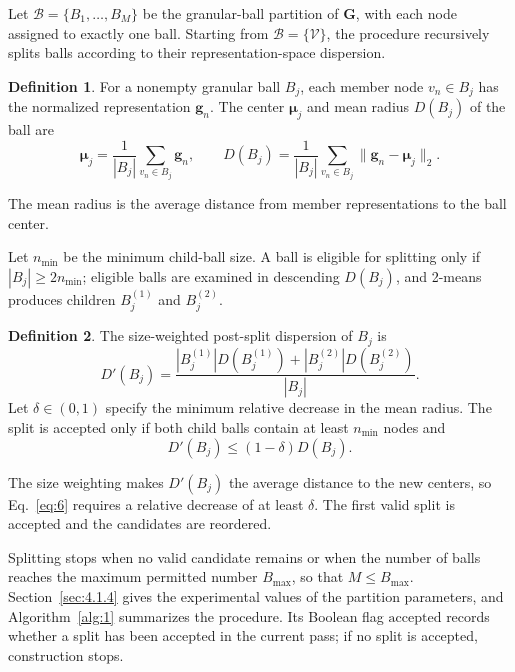 \documentclass[times,review,10pt]{elsarticle}
\theoremstyle{definition}
\newtheorem{definition}{Definition}
\theoremstyle{plain}
\begin{document}
Let \(\mathcal B=\{B_1,\ldots,B_M\}\) be the granular-ball partition of \(\mathbf G\), with each node assigned to exactly one ball. Starting from \(\mathcal B=\{\mathcal V\}\), the procedure recursively splits balls according to their representation-space dispersion.

\begin{definition}
For a nonempty granular ball \(B_j\), each member node \(v_n\in B_j\) has the normalized representation \(\mathbf g_n\). The center \(\boldsymbol\mu_j\) and mean radius \(D(B_j)\) of the ball are
\begin{equation}\label{eq:4}
\boldsymbol\mu_j=\frac{1}{|B_j|}\sum_{v_n\in B_j}\mathbf g_n,
\qquad D(B_j)=\frac{1}{|B_j|}\sum_{v_n\in B_j}\|\mathbf g_n-\boldsymbol\mu_j\|_2.
\end{equation}
\end{definition}

The mean radius is the average distance from member representations to the ball center.


Let \(n_{\min}\) be the minimum child-ball size. A ball is eligible for splitting only if \(|B_j|\geq2n_{\min}\); eligible balls are examined in descending \(D(B_j)\), and 2-means produces children \(B_j^{(1)}\) and \(B_j^{(2)}\).

\begin{definition}
The size-weighted post-split dispersion of \(B_j\) is
\begin{equation}\label{eq:5}
D'(B_j) = \frac{|B_j^{(1)}|D(B_j^{(1)}) + |B_j^{(2)}|D(B_j^{(2)})}{|B_j|}.
\end{equation}
Let \(\delta \in (0,1)\) specify the minimum relative decrease in the mean radius. The split is accepted only if both child balls contain at least \(n_{\min}\) nodes and
\begin{equation}\label{eq:6}
D'(B_j) \leq (1 - \delta)D(B_j).
\end{equation}
\end{definition}

The size weighting makes \(D'(B_j)\) the average distance to the new centers, so Eq.~\eqref{eq:6} requires a relative decrease of at least \(\delta\). The first valid split is accepted and the candidates are reordered.

Splitting stops when no valid candidate remains or when the number of balls reaches the maximum permitted number \(B_{\max}\), so that \(M\leq B_{\max}\). Section~\ref{sec:4.1.4} gives the experimental values of the partition parameters, and Algorithm~\ref{alg:1} summarizes the procedure. Its Boolean flag \(\mathrm{accepted}\) records whether a split has been accepted in the current pass; if no split is accepted, construction stops.
\end{document}
